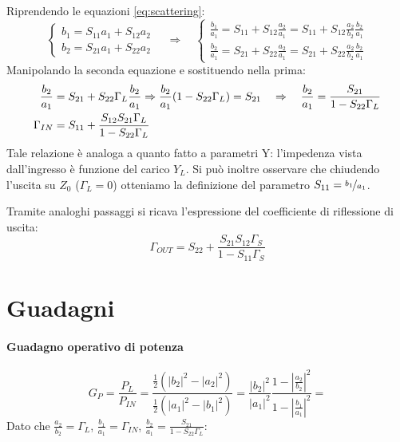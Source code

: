 Riprendendo le equazioni \ref{eq:scattering}:
\[
\begin{cases}
b_1 = S_{11}a_1 + S_{12}a_2\\
b_2 = S_{21}a_1 + S_{22}a_2
\end{cases}
\quad\Rightarrow\quad
\begin{cases}
\frac{b_1}{a_1} = S_{11} + S_{12}\frac{a_2}{a_1}=
S_{11} + S_{12}\frac{a_2}{b_2}\frac{b_2}{a_1}\\
\frac{b_2}{a_1} = S_{21} + S_{22}\frac{a_2}{a_1}=
S_{21} + S_{22}\frac{a_2}{b_2}\frac{b_2}{a_1}
\end{cases}
\]
Manipolando la seconda equazione e sostituendo nella prima:
\begin{align}
\frac{b_2}{a_1} &= S_{21} + S_{22}\Gamma_L\frac{b_2}{a_1}
\Rightarrow
\frac{b_2}{a_1}(1-S_{22}\Gamma_L) = S_{21}
\quad\Rightarrow\quad
\frac{b_2}{a_1}= \frac{ S_{21}}{1-S_{22}\Gamma_L}
\nonumber\\
\Gamma_{IN} &= S_{11} + \frac{S_{12} S_{21} \Gamma_L}{1-S_{22}\Gamma_L}
\label{eq:gammain}
\end{align}
Tale relazione è analoga a quanto fatto a parametri Y: l'impedenza vista dall'ingresso è funzione del carico $Y_{L}$.
Si può inoltre osservare che chiudendo l'uscita su $Z_0$ ($\Gamma_L = 0$) otteniamo la definizione del parametro $S_{11} = \nicefrac{b_1}{a_1}$.


Tramite analoghi passaggi si ricava l'espressione del coefficiente di riflessione di uscita:
\begin{equation}
\Gamma_{OUT} = S_{22} + \frac{S_{21} S_{12} \Gamma_S}{1-S_{11}\Gamma_S}
\label{eq:gammaout}
\end{equation}

\section{Guadagni}

\paragraph{Guadagno operativo di potenza}
\[G_P = \frac{P_L}{P_{IN}} = \frac{\frac{1}{2} \left( |b_2|^2 - |a_2|^2 \right)}{\frac{1}{2} \left( |a_1|^2 - |b_1|^2 \right)} = \frac{|b_2|^2}{|a_1|^2}\frac
{1-\left|\frac{a_2}{b_2} \right|^2}
{1-\left|\frac{b_1}{a_1} \right|^2}
=\]
Dato che $\frac{a_2}{b_2} = \Gamma_{L}$, $\frac{b_1}{a_1} = \Gamma_{IN}$, $\frac{b_2}{a_1} = \frac{S_{21}}{1-S_{22}\Gamma_{L}}$:

